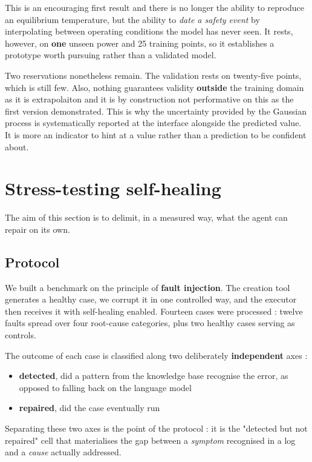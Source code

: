 \documentclass[12pt,a4paper]{report}
\begin{document}
This is an encouraging first result and there is no longer
the ability to reproduce an equilibrium temperature, but the ability to
\emph{date a safety event} by interpolating between operating conditions the
model has never seen. It rests, however, on \textbf{one} unseen power and
\num{25} training points, so it establishes a prototype worth pursuing rather
than a validated model.

Two reservations nonetheless remain. The validation rests on twenty-five points,
which is still few. Also, nothing guarantees validity \textbf{outside} the training domain as it is extrapolaiton and it is by construction not performative on this as the first
version demonstrated. This is why the uncertainty
provided by the Gaussian process is systematically reported at the interface
alongside the predicted value. It is more an indicator to hint at a value rather than a prediction to be confident about.

\section{Stress-testing self-healing}
\label{sec:epreuve}

The aim of this section is to delimit, in a measured way,
what the agent can repair on its own.

\subsection{Protocol}

We built a benchmark on the principle of \textbf{fault injection}. The creation
tool generates a healthy case, we corrupt it in one controlled way, and the
executor then receives it with self-healing enabled.
Fourteen cases were processed : twelve faults spread over four root-cause
categories, plus two healthy cases serving as controls.

The outcome of each case is classified along two deliberately
\textbf{independent} axes :
\begin{itemize}
  \item \textbf{detected}, did a pattern from the knowledge base recognise the
    error, as opposed to falling back on the language model
  \item \textbf{repaired}, did the case eventually run
\end{itemize}

Separating these two axes is the point of the protocol : it is the "detected but
not repaired" cell that materialises the gap between a \emph{symptom}
recognised in a log and a \emph{cause} actually addressed.
\end{document}
